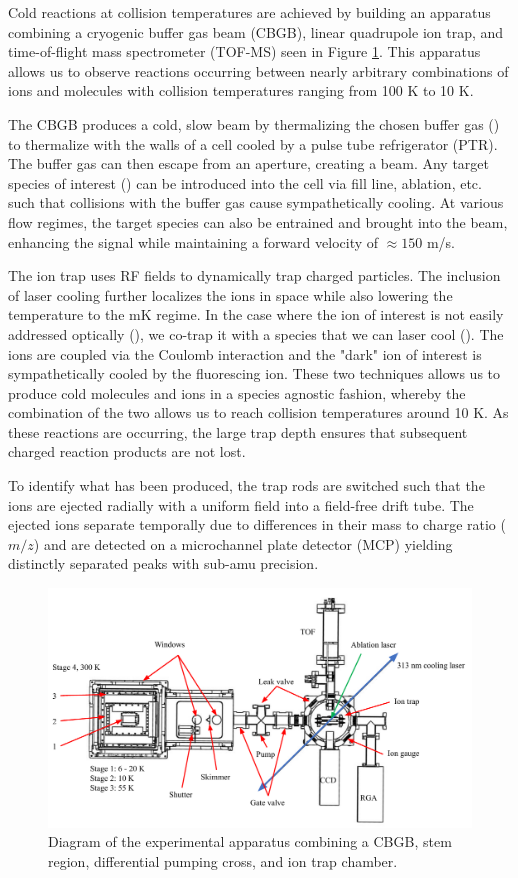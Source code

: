 Cold reactions at collision temperatures are achieved by building an apparatus combining a cryogenic buffer gas beam (CBGB), linear quadrupole ion trap, and time-of-flight mass spectrometer (TOF-MS) seen in Figure \ref{fig: apparatus}. This apparatus allows us to observe reactions occurring between nearly arbitrary combinations of ions and molecules with collision temperatures ranging from 100 K to 10 K.

The CBGB produces a cold, slow beam by thermalizing the chosen buffer gas () to thermalize with the walls of a cell cooled by a pulse tube refrigerator (PTR). The buffer gas can then escape from an aperture, creating a beam. Any target species of interest () can be introduced into the cell via fill line, ablation, etc. such that collisions with the buffer gas cause sympathetically cooling. At various flow regimes, the target species can also be entrained and brought into the beam, enhancing the signal while maintaining a forward velocity of $\approx 150$ m/s.

The ion trap uses RF fields to dynamically trap charged particles. The inclusion of laser cooling further localizes the ions in space while also lowering the temperature to the mK regime. In the case where the ion of interest is not easily addressed optically (), we co-trap it with a species that we can laser cool (). The ions are coupled via the Coulomb interaction and the "dark" ion of interest is sympathetically cooled by the fluorescing ion. These two techniques allows us to produce cold molecules and ions in a species agnostic fashion, whereby the combination of the two allows us to reach collision temperatures around 10 K. As these reactions are occurring, the large trap depth ensures that subsequent charged reaction products are not lost.

To identify what has been produced, the trap rods are switched such that the ions are ejected radially with a uniform field into a field-free drift tube. The ejected ions separate temporally due to differences in their mass to charge ratio ($m/z$) and are detected on a microchannel plate detector (MCP) yielding distinctly separated peaks with sub-amu precision.

\begin{figure}[H]
	\centering
	\includegraphics[width=\textwidth]{images/Apparatus.pdf}
	\caption{Diagram of the experimental apparatus combining a CBGB, stem region, differential pumping cross, and ion trap chamber.}
	\label{fig: apparatus}
\end{figure}